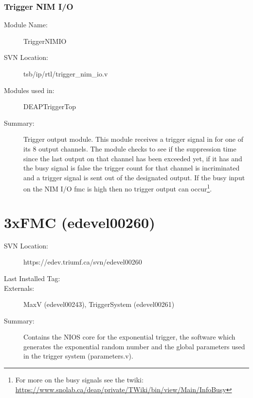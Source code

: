 		\subsubsection{Trigger NIM I/O}
		\label{sec:triggerNIMIO}
		\begin{description}
		\item[Module Name:] TriggerNIMIO
		\item[SVN Location:]  tsb/ip/rtl/trigger\_nim\_io.v
		\item[Modules used in:] DEAPTriggerTop
		\item[Summary:] Trigger output module. This module receives a trigger signal in for one of its 8 output channels. The module checks to see if the suppression time since the last output on that channel has been exceeded yet, if it has and the busy signal is false the trigger count for that channel is incriminated and a trigger signal is sent out of the designated output. If the busy input on the NIM I/O \gls{fmc} is high then no trigger output can occur\footnote{For more on the busy signals see the twiki: \url{https://www.snolab.ca/deap/private/TWiki/bin/view/Main/InfoBusy}}.
		\end{description}
	

	
\section{3xFMC (edevel00260)} 
\label{sec:260}
\begin{description}
\item[SVN Location:] https://edev.triumf.ca/svn/edevel00260
\item[Last Installed Tag:] \tagTwoSixZero %
\item[Externals:] MaxV (edevel00243), TriggerSystem (edevel00261) 
\item[Summary:] Contains the NIOS core for the exponential trigger, the software which generates the exponential random number and the global parameters used in the trigger system (parameters.v).
\end{description}

